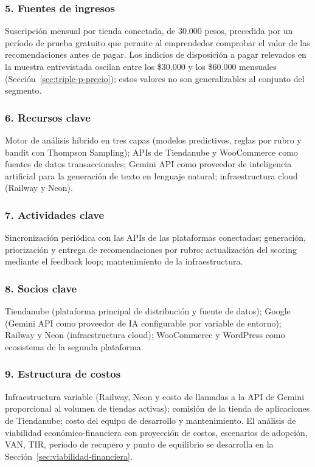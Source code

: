 \subsubsection*{5. Fuentes de ingresos}

Suscripción mensual por tienda conectada, de 30.000 pesos, precedida por un período de prueba gratuito que permite al emprendedor comprobar el valor de las recomendaciones antes de pagar. Los indicios de disposición a pagar relevados en la muestra entrevistada oscilan entre los \$30.000 y los \$60.000 mensuales (Sección~\ref{sec:triple-p-precio}); estos valores no son generalizables al conjunto del segmento.

\subsubsection*{6. Recursos clave}

Motor de análisis híbrido en tres capas (modelos predictivos, reglas por rubro y bandit con Thompson Sampling); APIs de Tiendanube y WooCommerce como fuentes de datos transaccionales; Gemini API como proveedor de inteligencia artificial para la generación de texto en lenguaje natural; infraestructura cloud (Railway y Neon).

\subsubsection*{7. Actividades clave}

Sincronización periódica con las APIs de las plataformas conectadas; generación, priorización y entrega de recomendaciones por rubro; actualización del scoring mediante el feedback loop; mantenimiento de la infraestructura.

\subsubsection*{8. Socios clave}

Tiendanube (plataforma principal de distribución y fuente de datos); Google (Gemini API como proveedor de IA configurable por variable de entorno); Railway y Neon (infraestructura cloud); WooCommerce y WordPress como ecosistema de la segunda plataforma.

\subsubsection*{9. Estructura de costos}

Infraestructura variable (Railway, Neon y costo de llamadas a la API de Gemini proporcional al volumen de tiendas activas); comisión de la tienda de aplicaciones de Tiendanube; costo del equipo de desarrollo y mantenimiento. El análisis de viabilidad económico-financiera con proyección de costos, escenarios de adopción, VAN, TIR, período de recupero y punto de equilibrio se desarrolla en la Sección~\ref{sec:viabilidad-financiera}.

